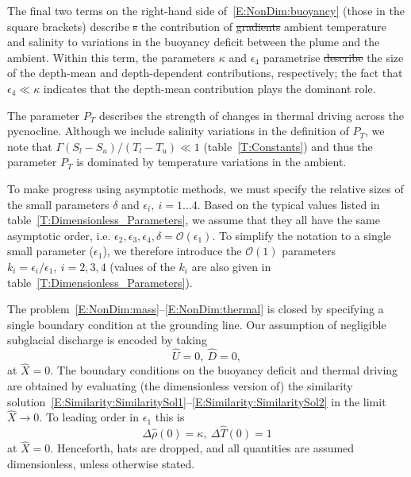 \documentclass[openacc]{rsproca_new}%
\newcommand{\order}[1]{\mathcal{O}(#1)}
\newcommand{\red}[1]{{\color{red} #1}}
\newcommand{\blue}[1]{{\color{blue} #1}}
\newcommand{\rout}[1]{\red{\st{#1}}}\newcommand{\ab}[1]{\textcolor{Green}{#1}}\newcommand{\about}[1]{\textcolor{Cyan}{\sout{#1}}}
\newcommand{\epsone}{\epsilon_{1}} %
\newcommand{\epstwo}{\epsilon_{2}} %
\newcommand{\epsthree}{\epsilon_{3}} %
\newcommand{\epsfour}{\epsilon_{4}}
\newcommand{\lt}{\delta} %
\newcommand{\Pt}{\textit{P}_T}
\begin{document}
The final \blue{two} terms on the right-hand side of~\eqref{E:NonDim:buoyancy} \blue{(those in the square brackets)} describe\rout{s} the contribution of \rout{gradients }ambient temperature and salinity to variations in \blue{the} buoyancy deficit \blue{between the plume and the ambient}. Within this term, the parameters $\kappa$ and $\epsfour$ \blue{parametrise} \rout{describe }the \blue{size of the} depth-mean and depth-dependent contributions, respectively; the fact that $\epsfour \ll \kappa$ indicates that the depth-mean contribution plays the dominant role.

The parameter $\Pt$ describes the strength of changes in thermal driving across the pycnocline. Although we include salinity variations in the definition of $\Pt$, we note that $\Gamma (S_l - S_u)/(T_l - T_u) \ll 1$ (table~\ref{T:Constants}) and thus the parameter $\Pt$ is dominated by temperature variations in the ambient.

To make progress using asymptotic methods, we must specify the relative sizes of the small parameters $\lt$ and $\epsilon_i, ~i = 1\dots4$. Based on the typical values listed in table~\ref{T:Dimensionless_Parameters}, we assume that they all have the same asymptotic order, i.e. $\epstwo, \epsthree, \epsfour, \lt = \order{\epsone}$. To simplify the notation to a single small parameter ($\epsone$), we therefore introduce the $\order{1}$ parameters $k_i =\epsilon_i/ \epsone,~i = 2,3,4$ (values of the $k_i$ are also given in table~\ref{T:Dimensionless_Parameters}).

The problem~\eqref{E:NonDim:mass}--\eqref{E:NonDim:thermal} is closed by specifying a single boundary condition at the grounding line. Our assumption of negligible subglacial discharge is encoded by taking
\begin{equation}\label{E:NonDim:IC1}
\hat{U} =0,~\hat{D} = 0,
\end{equation}
at $\hat{X} = 0$. The boundary conditions on the buoyancy deficit and thermal driving are obtained by evaluating (the dimensionless version of) the similarity solution~\eqref{E:Similarity:SimilaritySol1}--\eqref{E:Similarity:SimilaritySol2} in the limit $\hat{X} \to 0$. To leading order in $\epsone$ this is
\begin{equation}\label{E:NonDim:IC2}
  \Delta\hat{\rho}(0) = \kappa,~\Delta \hat{T}(0) = 1  
\end{equation}
at $\hat{X} = 0$. Henceforth, hats are dropped, and all quantities are assumed dimensionless, unless otherwise stated.
\end{document}
